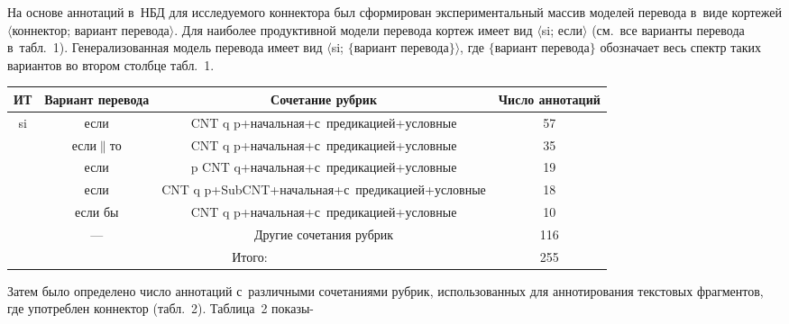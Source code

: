 \begin{multicols}{2}
  На основе аннотаций в~НБД для исследуемого коннектора был 
сформирован экспериментальный массив моделей перевода в~виде кортежей 
$\langle$коннектор; вариант перевода$\rangle$. Для наиболее продуктивной 
модели перевода кортеж имеет вид $\langle$si; если$\rangle$ (см.\ все 
варианты перевода в~табл.~1). Генерализованная модель перевода имеет вид 
$\langle$si; $\{$вариант перевода$\}$$\rangle$, где $\{$вариант перевода$\}$ 
обозначает весь спектр таких вариантов во втором столбце табл.~1.

\setcounter{table}{1}
\begin{table*}\small
\begin{center}
\vspace*{2ex}

\tabcolsep=7.6pt
\begin{tabular}{|c|c|c|c|}
\hline
  ИТ&Вариант перевода&Сочетание рубрик&Число аннотаций\\
  \hline
  si&если&CNT q p\;+\;начальная\;+\;с~предикацией\;+\;условные&57\\
  &если$\|$то&CNT q p\;+\;начальная\;+\;с~предикацией\;+\;условные&35\\
  &если&p CNT q\;+\;начальная\;+\;с~предикацией\;+\;условные&19\\
  &если&CNT q p\;+\;SubCNT\;+\;начальная\;+\;с~предикацией\;+\;условные&18\\
  &если бы&CNT q p\;+\;начальная\;+\;с~предикацией\;+\;условные&10\\
  &---&Другие сочетания рубрик&116\hphantom{9}\\
  \hline
 \multicolumn{3}{|c|}{Итого:}&255\hphantom{9}\\
  \hline
  \end{tabular}
  \end{center}
  \end{table*}

  
  Затем было определено число аннотаций с~различными сочетаниями 
рубрик, использованных для аннотирования текстовых фрагментов, где 
употреблен коннектор (табл.~2). Таблица~2 показы-\linebreak\vspace*{-12pt}


\begin{center}
\vspace*{-3pt}


\end{center}
\end{multicols}
